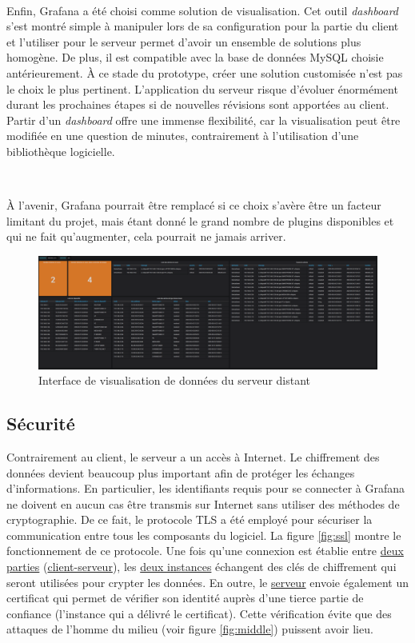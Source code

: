 ~

\noindent
Enfin, Grafana a été choisi comme solution de visualisation. Cet outil \textit{dashboard} s’est montré simple à manipuler lors de sa configuration pour la partie du client et l’utiliser pour le serveur permet d’avoir un ensemble de solutions plus homogène. De plus, il est compatible avec la base de données MySQL choisie antérieurement. À ce stade du prototype, créer une solution customisée n’est pas le choix le plus pertinent. L’application du serveur risque d’évoluer énormément durant les prochaines étapes si de nouvelles révisions sont apportées au client. Partir d’un \textit{dashboard} offre une immense flexibilité, car la visualisation peut être modifiée en une question de minutes, contrairement à l’utilisation d’une bibliothèque logicielle.

~

\noindent
À l'avenir, Grafana pourrait être remplacé si ce choix s’avère être un facteur limitant du projet, mais étant donné le grand nombre de plugins disponibles et qui ne fait qu’augmenter, cela pourrait ne jamais arriver.


\begin{figure}[ht!]
  \includegraphics[width=\textwidth]{img/app/grafana_server.png}
  \caption{Interface de visualisation de données du serveur distant}
  \label{fig:graf_server}
\end{figure}

\subsection{Sécurité}

\noindent
Contrairement au client, le serveur a un accès à Internet. Le chiffrement des données devient beaucoup plus important afin de protéger les échanges d'informations. En particulier, les identifiants requis pour se connecter à Grafana ne doivent en aucun cas être transmis sur Internet sans utiliser des méthodes de cryptographie. De ce fait, le protocole TLS a été employé pour sécuriser la communication entre tous les composants du logiciel. La figure \ref{fig:ssl} montre le fonctionnement de ce protocole. Une fois qu’une connexion est établie entre \underline{deux parties} (\underline{client-serveur}), les \underline{deux instances} échangent des clés de chiffrement qui seront utilisées pour crypter les données. En outre, le \underline{serveur} envoie également un certificat qui permet de vérifier son identité auprès d’une tierce partie de confiance (l’instance qui a délivré le certificat).  Cette vérification évite que des attaques de l'homme du milieu (voir figure \ref{fig:middle}) puissent avoir lieu.


